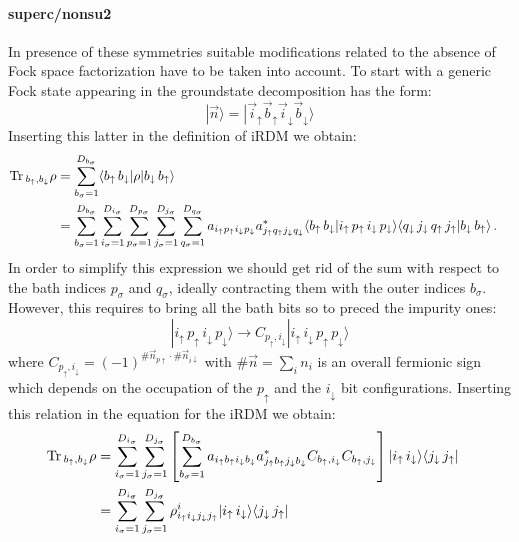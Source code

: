 \documentclass[preprint,3p,10pt]{elsarticle}
\newcommand{\ket}[1]
{|#1\rangle}
\newcommand{\bra}[1]
{\langle #1|}
\def\up{\uparrow} \def\down{\downarrow} \def\dw{\downarrow}
\begin{document}
\paragraph{{\bf superc/nonsu2}}
In presence of these symmetries suitable modifications related to the
absence of Fock space factorization have to be taken into account. To
start with a generic Fock state appearing in the groundstate
decomposition has the form:
$$
\ket{\vec{n}} =\ket{\vec{i}_\up\vec{b}_\up\vec{i}_\dw\vec{b}_\dw}
%
$$
Inserting this latter in the definition of iRDM we obtain:
\begin{equation}
  \begin{aligned}
    \Tr_{b_\up, b_\dw}{\rho} &=
    \sum_{b_\sigma=1}^{D_{b_\sigma}}
    \bra{b_\up\, b_\dw}
    \rho
    \ket{b_\dw\, b_\up}    \cr
    &=
    \sum_{b_\sigma=1}^{D_{b_\sigma}}
    \sum_{i_\sigma=1}^{D_{i_\sigma}}
    \sum_{p_\sigma=1}^{D_{p_\sigma}}
    \sum_{j_\sigma=1}^{D_{j_\sigma}} 
    \sum_{q_\sigma=1}^{D_{q_\sigma}}
    a_{i_\up p_\up i_\dw p_\dw} a^*_{j_\up q_\up j_\dw q_\dw}%
    \langle{b_\up\, b_\dw}|{i_\up\, p_\up\, i_\dw\, p_\dw}\rangle
    \langle{q_\dw \,  j_\dw \, q_\up\, j_\up }|{b_\dw\, b_\up}\rangle\, .
  \end{aligned}
\end{equation}
In order to simplify this expression we should get rid of the sum with
respect to the bath indices $p_\sigma$ and $q_\sigma$, ideally
contracting them with the outer indices $b_\sigma$.
However, this requires to bring all the bath bits so to preced the
impurity ones:
$$
\ket{i_\up\, p_\up\, i_\dw\, p_\dw} \rightarrow C_{p_\up,i_\dw} \ket{i_\up\, i_\dw \,p_\up\,p_\dw}
$$
where $C_{p_\up,i_\dw}  = (-1)^{\#\vec{n}_{p\up} \cdot
  \#\vec{n}_{i\dw}}$ with   $\#\vec{n}=\sum_i n_i$ is an overall
fermionic sign which depends on the occupation of the $p_\up$ and the
$i_\dw$ bit configurations. Inserting this relation in the equation
for the iRDM we obtain:
\begin{equation}
  \begin{aligned}
    \Tr_{b_\up, b_\dw}{\rho} &=
    \sum_{i_\sigma=1}^{D_{i_\sigma}}
    \sum_{j_\sigma=1}^{D_{j_\sigma}}
    \left[\sum_{b_\sigma=1}^{D_{b_\sigma}}
    a_{i_\up b_\up i_\dw b_\dw} a^*_{j_\up b_\up j_\dw b_\dw}
    C_{b_\up,i_\dw}C_{b_\up,j_\dw}\right]
    \ket{i_\up\, i_\dw}\bra{j_\dw \, j_\up}\cr
&=
    \sum_{i_\sigma=1}^{D_{i_\sigma}}
    \sum_{j_\sigma=1}^{D_{j_\sigma}}
    \rho^{i}_{i_\up i_\dw j_\dw j_\up}
    \ket{i_\up\, i_\dw}\bra{j_\dw \, j_\up} 
  \end{aligned}
\end{equation}
\end{document}
